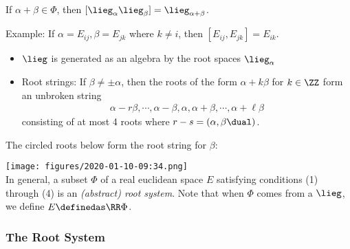 \begin{remark}

\label{rmk:aside2} If \(\alpha + \beta \in \Phi\), then
\([\lieg_\alpha \lieg_\beta] = \lieg_{\alpha+\beta}\).

\begin{example}[?]

Example: If \(\alpha = E_{ij}, \beta = E_{jk}\) where \(k\neq i\), then
\([E_{ij}, E_{jk}]= E_{ik}\).

\end{example}

\begin{itemize}
\tightlist
\item
  \(\lieg\) is generated as an algebra by the root spaces
  \(\lieg_\alpha\)
\item
  Root strings: If \(\beta \neq \pm\alpha\), then the roots of the form
  \(\alpha + k\beta\) for \(k\in \ZZ\) form an unbroken string
  \begin{align*}
  \alpha - r\beta, \cdots, \alpha-\beta, \alpha,\alpha+\beta,\cdots,\alpha + \ell \beta
  \end{align*} consisting of at most 4 roots where
  \(r-s = (\alpha, \beta\dual)\).
\end{itemize}

\end{remark}

\begin{example}[?]

The circled roots below form the root string for \(\beta\):

\texttt{[image: figures/2020-01-10-09:34.png]}\\

In general, a subset \(\Phi\) of a real euclidean space \(E\) satisfying
conditions (1) through (4) is an \emph{(abstract) root system}. Note
that when \(\Phi\) comes from a \(\lieg\), we define
\(E\definedas \RR \Phi\).

\end{example}

\hypertarget{the-root-system}{%
\subsubsection{The Root System}\label{the-root-system}}


